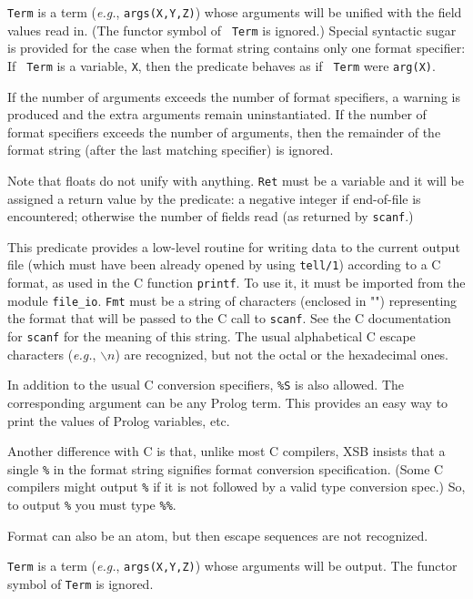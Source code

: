 \begin{description}
    {\tt Term} is a term ({\it e.g.}, {\tt args(X,Y,Z)})  whose arguments
    will be unified with the field values read in.  (The functor symbol of {\tt
    Term} is ignored.)  Special syntactic sugar is provided for the case
    when the format string contains only one format specifier: If {\tt
    Term} is a variable, {\tt X}, then the predicate behaves as if {\tt
    Term} were {\tt arg(X)}.

  If the number of arguments exceeds the number of format specifiers, a
  warning is produced and the extra arguments remain uninstantiated.
  If the number of format specifiers exceeds the number of arguments, then
  the remainder of the format string (after the last matching specifier) is
  ignored.
  
  Note that floats do not unify with anything.  {\tt Ret} must be a
  variable and it will be assigned a return value by the predicate: a
  negative integer if end-of-file is encountered; otherwise the number of
  fields read (as returned by {\tt scanf}.)

    This predicate provides a low-level routine for writing data to
    the current output file (which must have been already opened by using
    {\tt tell/1}) according to a C format, as used in the C function
    {\tt printf}.
    To use it, it must be imported from the module {\tt file\_io}.
    {\tt Fmt} must be a string of characters (enclosed in "")
    representing the format that 
    will be passed to the C call to {\tt scanf}.  See the C
    documentation for {\tt scanf} for the meaning of this string.
    The usual alphabetical C escape characters ({\it e.g.}, $\backslash n$)
    are recognized, but not the octal or the hexadecimal ones.

    In addition to the usual C conversion specifiers, {\tt \%S} is also
    allowed. The corresponding argument can be any Prolog term. This
    provides an easy way to print the values of Prolog variables, etc.

    Another difference with C is that, unlike most C compilers, XSB insists
    that a single {\tt \%} in the format string signifies format conversion
    specification. (Some C compilers might output {\tt \%} if it is not
    followed by a valid type conversion spec.) So, to output {\tt \%}
    you must type {\tt \%\%}.
    
    Format can also be an atom, but then escape sequences are not
    recognized.

    {\tt Term} is a term ({\it e.g.}, {\tt args(X,Y,Z)}) whose arguments
    will be output. The functor symbol of {\tt Term} is ignored.
    

\end{description}
